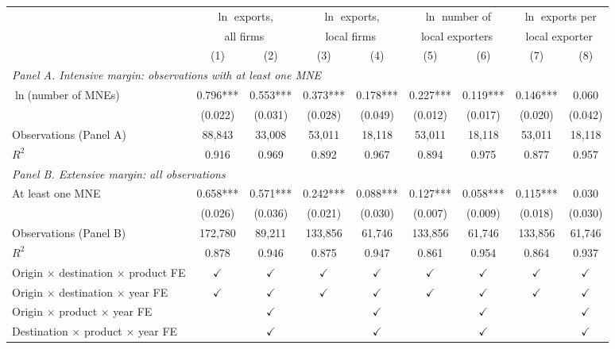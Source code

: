 \begin{tabular}{l*{8}{c}}
\toprule
 & \multicolumn{2}{c}{$\ln$ exports,} & \multicolumn{2}{c}{$\ln$ exports,} & \multicolumn{2}{c}{$\ln$ number of} & \multicolumn{2}{c}{$\ln$ exports per} \\
 & \multicolumn{2}{c}{all firms} & \multicolumn{2}{c}{local firms} & \multicolumn{2}{c}{local exporters} & \multicolumn{2}{c}{local exporter} \\
\cmidrule(lr){2-3}\cmidrule(lr){4-5}\cmidrule(lr){6-7}\cmidrule(lr){8-9}
 & (1) & (2) & (3) & (4) & (5) & (6) & (7) & (8) \\
\midrule
\multicolumn{9}{l}{\textit{Panel A. Intensive margin: observations with at least one MNE}} \\
$\ln$(number of MNEs) & 0.796*** & 0.553*** & 0.373*** & 0.178*** & 0.227*** & 0.119*** & 0.146*** & 0.060 \\
 & (0.022) & (0.031) & (0.028) & (0.049) & (0.012) & (0.017) & (0.020) & (0.042) \\
Observations (Panel A) & 88,843 & 33,008 & 53,011 & 18,118 & 53,011 & 18,118 & 53,011 & 18,118 \\
$R^2$ & 0.916 & 0.969 & 0.892 & 0.967 & 0.894 & 0.975 & 0.877 & 0.957 \\
\midrule
\multicolumn{9}{l}{\textit{Panel B. Extensive margin: all observations}} \\
At least one MNE & 0.658*** & 0.571*** & 0.242*** & 0.088*** & 0.127*** & 0.058*** & 0.115*** & 0.030 \\
 & (0.026) & (0.036) & (0.021) & (0.030) & (0.007) & (0.009) & (0.018) & (0.030) \\
Observations (Panel B) & 172,780 & 89,211 & 133,856 & 61,746 & 133,856 & 61,746 & 133,856 & 61,746 \\
$R^2$ & 0.878 & 0.946 & 0.875 & 0.947 & 0.861 & 0.954 & 0.864 & 0.937 \\
\midrule
Origin $\times$ destination $\times$ product FE & $\checkmark$ & $\checkmark$ & $\checkmark$ & $\checkmark$ & $\checkmark$ & $\checkmark$ & $\checkmark$ & $\checkmark$ \\
Origin $\times$ destination $\times$ year FE & $\checkmark$ & $\checkmark$ & $\checkmark$ & $\checkmark$ & $\checkmark$ & $\checkmark$ & $\checkmark$ & $\checkmark$ \\
Origin $\times$ product $\times$ year FE &  & $\checkmark$ &  & $\checkmark$ &  & $\checkmark$ &  & $\checkmark$ \\
Destination $\times$ product $\times$ year FE &  & $\checkmark$ &  & $\checkmark$ &  & $\checkmark$ &  & $\checkmark$ \\
\bottomrule
\end{tabular}
